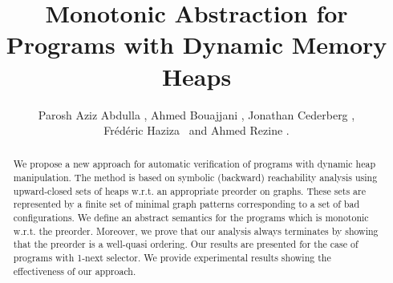 %
%
\title{%
Monotonic Abstraction for Programs with Dynamic Memory Heaps
%
}


\author{%
Parosh Aziz Abdulla%
, %
Ahmed Bouajjani%
, %
Jonathan Cederberg%
, \\%
Fr\'ed\'eric Haziza%
\ and %
Ahmed Rezine%
.
}


\maketitle

\vspace{-5mm}
\begin{abstract}
  We propose a new approach for automatic verification of programs
  with dynamic heap manipulation. The method is based on symbolic
  (backward) reachability analysis using upward-closed sets of heaps
  w.r.t. an appropriate preorder on graphs. These sets are represented
  by a finite set of minimal graph patterns corresponding to a set of
  bad configurations. We define an abstract semantics for the programs
  which is monotonic w.r.t. the preorder. Moreover, we prove that our
  analysis always terminates by showing that the preorder is a
  well-quasi ordering. Our results are presented for the case of
  programs with 1-next selector. We provide experimental results
  showing the effectiveness of our approach.
\end{abstract}
\vspace{-8mm}
